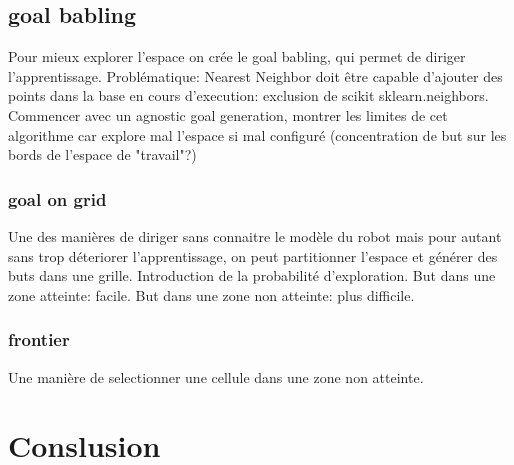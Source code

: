 \documentclass[11pt,french]{article}
\begin{document}
\subsection{goal babling}
Pour mieux explorer l'espace on crée le goal babling, qui permet de diriger l'apprentissage. Problématique: Nearest Neighbor doit être capable d'ajouter des points dans la base en cours d'execution: exclusion de scikit sklearn.neighbors. Commencer avec un agnostic goal generation, montrer les limites de cet algorithme car explore mal l'espace si mal configuré (concentration de but sur les bords de l'espace de "travail"?)

\subsubsection{goal on grid}
Une des manières de diriger sans connaitre le modèle du robot mais pour autant sans trop déteriorer l'apprentissage, on peut partitionner l'espace et générer des buts dans une grille. Introduction de la probabilité d'exploration. But dans une zone atteinte: facile. But dans une zone non atteinte: plus difficile.

\subsubsection{frontier}
Une manière de selectionner une cellule dans une zone non atteinte.



\section{Conslusion}
\end{document}
